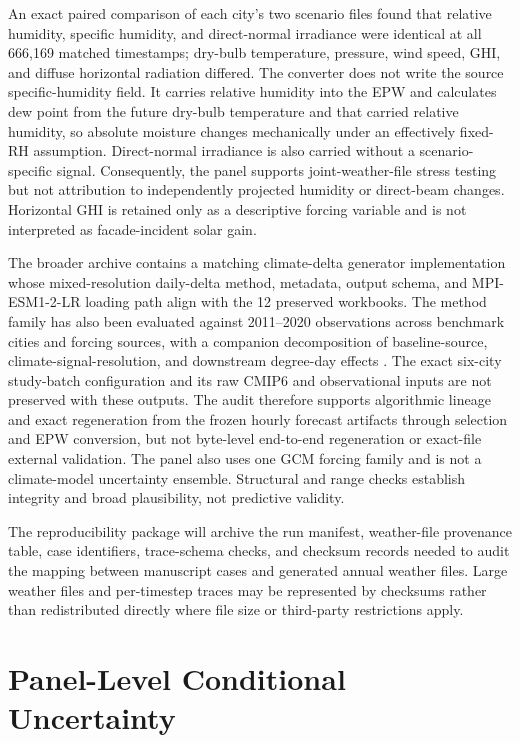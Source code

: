 \documentclass[11pt]{article}
\begin{document}
An exact paired comparison of each city's two scenario files found that relative humidity, specific humidity, and direct-normal irradiance were identical at all 666{,}169 matched timestamps; dry-bulb temperature, pressure, wind speed, GHI, and diffuse horizontal radiation differed. The converter does not write the source specific-humidity field. It carries relative humidity into the EPW and calculates dew point from the future dry-bulb temperature and that carried relative humidity, so absolute moisture changes mechanically under an effectively fixed-RH assumption. Direct-normal irradiance is also carried without a scenario-specific signal. Consequently, the panel supports joint-weather-file stress testing but not attribution to independently projected humidity or direct-beam changes. Horizontal GHI is retained only as a descriptive forcing variable and is not interpreted as facade-incident solar gain.

The broader archive contains a matching climate-delta generator implementation whose mixed-resolution daily-delta method, metadata, output schema, and MPI-ESM1-2-LR loading path align with the 12 preserved workbooks. The method family has also been evaluated against 2011--2020 observations across benchmark cities and forcing sources, with a companion decomposition of baseline-source, climate-signal-resolution, and downstream degree-day effects \citep{GuoHe2026sAMY,GuoHe2026InputQuality}. The exact six-city study-batch configuration and its raw CMIP6 and observational inputs are not preserved with these outputs. The audit therefore supports algorithmic lineage and exact regeneration from the frozen hourly forecast artifacts through selection and EPW conversion, but not byte-level end-to-end regeneration or exact-file external validation. The panel also uses one GCM forcing family and is not a climate-model uncertainty ensemble. Structural and range checks establish integrity and broad plausibility, not predictive validity.

The reproducibility package will archive the run manifest, weather-file provenance table, case identifiers, trace-schema checks, and checksum records needed to audit the mapping between manuscript cases and generated annual weather files. Large weather files and per-timestep traces may be represented by checksums rather than redistributed directly where file size or third-party restrictions apply.

\section{Panel-Level Conditional Uncertainty}
\end{document}

